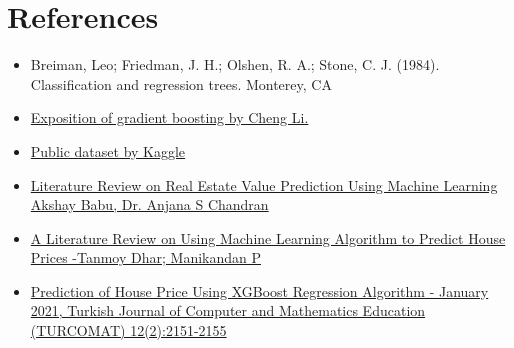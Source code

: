 \documentclass[a4paper, 12pt]{article}
\begin{document}
\section*{References}
\begin{itemize}
    \item Breiman, Leo; Friedman, J. H.; Olshen, R. A.; Stone, C. J. (1984). Classification and regression trees. Monterey, CA
    \item \href{https://www.chengli.io/tutorials/gradient_boosting.pdf}{Exposition of gradient boosting by Cheng Li.}
    \item \href{https://www.kaggle.com/datasets/amitabhajoy/bengaluru-house-price-data/data?select=Bengaluru_House_Data.csv}{Public dataset by Kaggle}
    \item \href{https://www.ijcsma.com/articles/literature-review-on-real-estate-value-prediction-using-machine-learning.pdf}{Literature Review on Real Estate Value Prediction Using Machine Learning Akshay Babu, Dr. Anjana S Chandran}
    \item \href{https://rspsciencehub.com/article_23797.html}{A Literature Review on Using Machine Learning Algorithm to Predict House Prices -Tanmoy Dhar; Manikandan P }
    \item \href{https://www.researchgate.net/publication/350810698_Prediction_of_House_Price_Using_XGBoost_Regression_Algorithm}{Prediction of House Price Using XGBoost Regression Algorithm - January 2021, Turkish Journal of Computer and Mathematics Education (TURCOMAT) 12(2):2151-2155}
\end{itemize}
\end{document}
